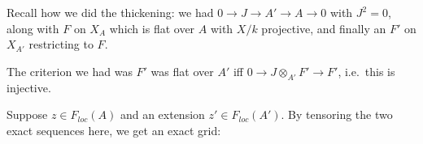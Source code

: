 Recall how we did the thickening: we had \(0 \to J \to A' \to A \to 0\)
with \(J^2 = 0\), along with \(F\) on \(X_A\) which is flat over \(A\)
with \(X/k\) projective, and finally an \(F'\) on \(X_{A'}\) restricting
to \(F\).

The criterion we had was \(F'\) was flat over \(A'\) iff
\(0 \to J\otimes_{A'} F' \to F'\), i.e.~this is injective.

Suppose \(z\in F_{loc}(A)\) and an extension \(z' \in F_{loc}(A')\). By
tensoring the two exact sequences here, we get an exact grid:

\begin{center}
  \end{center}

